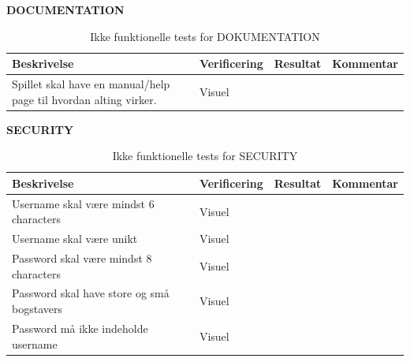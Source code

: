 \textbf{DOCUMENTATION}\\
\begin{table}[H]
\caption{ Ikke funktionelle tests for DOKUMENTATION}
\label{tab:}
\begin{tabular}{|p{3cm}|p{3cm}|p{3cm}|p{3cm}|}
\hline
Beskrivelse & Verificering & Resultat & Kommentar \\
\hline
Spillet skal have en manual/help page til hvordan alting virker. & Visuel & & \\
\hline
\end{tabular}
\end{table}

\textbf{SECURITY}\\
\begin{table}[H]
\caption{ Ikke funktionelle tests for SECURITY}
\label{tab:}
\begin{tabular}{|p{3cm}|p{3cm}|p{3cm}|p{3cm}|}
\hline
Beskrivelse & Verificering & Resultat & Kommentar \\
\hline
 Username skal være mindst 6 characters & Visuel & & \\
\hline
 Username skal være unikt & Visuel & & \\
\hline
 Password skal være mindst 8 characters & Visuel & & \\
\hline
 Password skal have store og små bogstavers & Visuel & & \\
\hline
 Password må ikke indeholde username & Visuel & & \\
\hline
\end{tabular}
\end{table}


